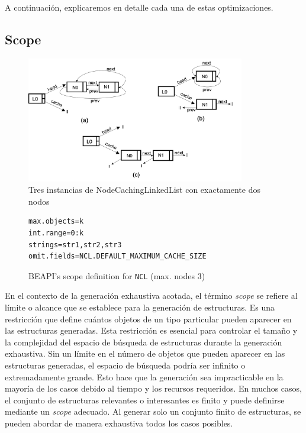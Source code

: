 A continuación, explicaremos en detalle cada una de estas optimizaciones.

\subsection{Scope}
\label{sec:scope}

\begin{figure}[H]
    \centering
    \includegraphics[width=0.85\textwidth]{images/NCL-instances.png}
    \caption{Tres instancias de NodeCachingLinkedList con exactamente dos nodos}
    \label{fig:ncl-instances}
\end{figure}

\begin{figure}[H]
\begin{lstlisting}[keywordstyle=\scriptsize\ttfamily]
max.objects=k
int.range=0:k
strings=str1,str2,str3
omit.fields=NCL.DEFAULT_MAXIMUM_CACHE_SIZE
\end{lstlisting}
\caption{\textsf{BEAPI}'s scope definition for \texttt{NCL} (max. nodes 3)}
\label{fig:NCL-fin-BEAPI}
\end{figure}

En el contexto de la generación exhaustiva acotada, el término \emph{scope} se refiere al límite o alcance que se establece para la generación de estructuras. Es una restricción que define cuántos objetos de un tipo particular pueden aparecer en las estructuras generadas. Esta restricción es esencial para controlar el tamaño y la complejidad del espacio de búsqueda de estructuras durante la generación exhaustiva. Sin un límite en el número de objetos que pueden aparecer en las estructuras generadas, el espacio de búsqueda podría ser infinito o extremadamente grande. Esto hace que la generación sea impracticable en la mayoría de los casos debido al tiempo y los recursos requeridos.  En muchos casos, el conjunto de estructuras relevantes o interesantes es finito y puede definirse mediante un \emph{scope} adecuado. Al generar solo un conjunto finito de estructuras, se pueden abordar de manera exhaustiva todos los casos posibles.

